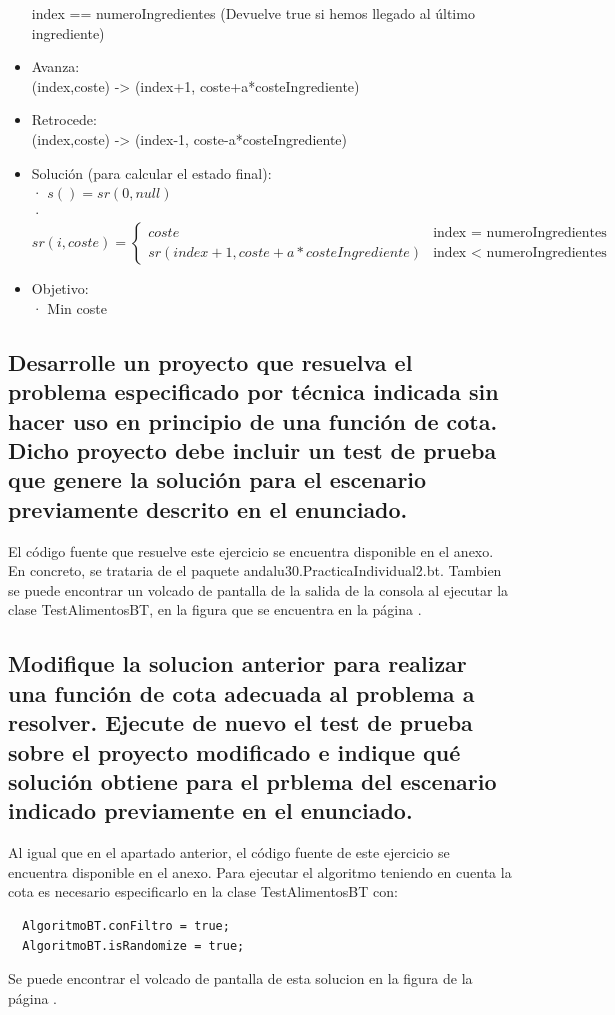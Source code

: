 \documentclass[a4paper,12pt]{article}
\begin{document}
\begin{itemize}
      index == numeroIngredientes (Devuelve true si hemos llegado al último ingrediente)
\item Avanza:\\
      (index,coste) -> (index+1, coste+a*costeIngrediente)
\item Retrocede:\\
      (index,coste) -> (index-1, coste-a*costeIngrediente)
\item Solución (para calcular el estado final):\\
      · $s() = sr(0,null)$\\
      · $sr(i, coste) =
      \begin{cases}
      coste  &\mbox{index = numeroIngredientes}\\
      sr(index+1, coste+a*costeIngrediente) &\mbox{index < numeroIngredientes}
      \end{cases}$

\item Objetivo:\\
      · Min coste


\end{itemize}


\subsection{Desarrolle un proyecto que resuelva el problema especificado por técnica indicada sin hacer uso en principio de una función de cota. Dicho proyecto debe incluir un test de prueba que genere la solución para el escenario previamente descrito en el enunciado.}
El código fuente que resuelve este ejercicio se encuentra disponible en el anexo. En concreto, se trataria de el paquete andalu30.PracticaIndividual2.bt.
Tambien se puede encontrar un volcado de pantalla de la salida de la consola al ejecutar la clase TestAlimentosBT, en la figura que se encuentra en la página \pageref{fig:btsincota}.
\subsection{Modifique la solucion anterior para realizar una función de cota adecuada al problema a resolver. Ejecute de nuevo el test de prueba sobre el proyecto modificado e indique qué solución obtiene para el prblema del escenario indicado previamente en el enunciado.}
Al igual que en el apartado anterior, el código fuente de este ejercicio se encuentra disponible en el anexo.
Para ejecutar el algoritmo teniendo en cuenta la cota es necesario especificarlo en la clase TestAlimentosBT con:
\begin{verbatim}
  AlgoritmoBT.conFiltro = true;
  AlgoritmoBT.isRandomize = true;
\end{verbatim}
Se puede encontrar el volcado de pantalla de esta solucion en la figura de la página \pageref{fig:btconcota}.
\end{document}
